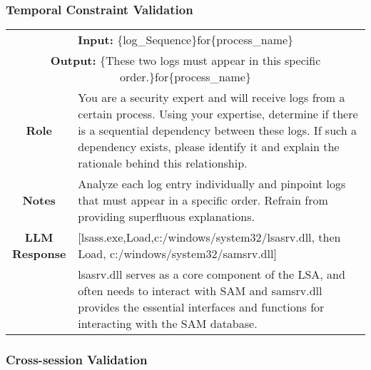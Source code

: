 \subsubsection{Temporal Constraint Validation}
\label{prompt-init-temporal}

\begin{tabularx}{\textwidth}{|c|X|}
\hline
\multicolumn{2}{|c|}{\textbf{Input:} \colorbox{SoftRed}{\{log\_Sequence\}}for\colorbox{codegreen}{\{process\_name\}}} \\
\multicolumn{2}{|c|}{\textbf{Output:} \colorbox{LightPeach}{\{These two logs must appear in this specific order.\}}for\colorbox{codegreen}{\{process\_name\}}} \\
\hline
\textbf{Role} & You are a security expert and will receive logs from a certain process. Using your expertise, determine if there is a sequential dependency between these logs. If such a dependency exists, please identify it and explain the rationale behind this relationship. \\
\hline
\textbf{Notes} &  Analyze each log entry individually and pinpoint logs that must appear in a specific order. Refrain from providing superfluous explanations. \\
\hline
\textbf{\colorbox{codeorange}{LLM Response}}  & [lsass.exe,Load,c:/windows/system32/lsasrv.dll, then Load, c:/windows/system32/samsrv.dll] \\
& lsasrv.dll  serves as a core component of the LSA, and often needs to interact with SAM and samsrv.dll provides the essential interfaces and functions for interacting with the SAM database.
\\
\hline
\end{tabularx}


\clearpage
\subsubsection{Cross-session Validation}
\label{prompt-cross-validation}


